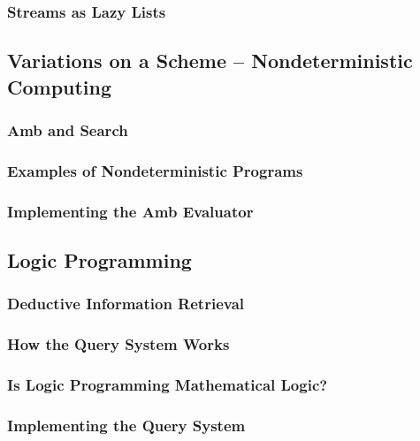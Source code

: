             \subsubsection{Streams as Lazy Lists}
        \subsection{Variations on a Scheme -- Nondeterministic Computing}
            \subsubsection{Amb and Search}
            \subsubsection{Examples of Nondeterministic Programs}
            \subsubsection{Implementing the Amb Evaluator}
        \subsection{Logic Programming}
            \subsubsection{Deductive Information Retrieval}
            \subsubsection{How the Query System Works}
            \subsubsection{Is Logic Programming Mathematical Logic?}
            \subsubsection{Implementing the Query System}

